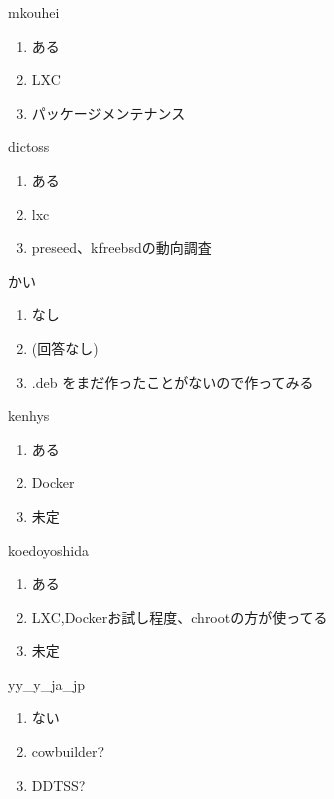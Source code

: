 \begin{prework}{ mkouhei }
  \begin{enumerate}
  \item ある
  \item LXC
  \item パッケージメンテナンス
  \end{enumerate}
\end{prework}

\begin{prework}{ dictoss }
  \begin{enumerate}
  \item ある
  \item lxc
  \item preseed、kfreebsdの動向調査
  \end{enumerate}
\end{prework}

\begin{prework}{ かい }
  \begin{enumerate}
  \item なし
  \item (回答なし)
  \item .deb をまだ作ったことがないので作ってみる
  \end{enumerate}
\end{prework}

\begin{prework}{ kenhys }
  \begin{enumerate}
  \item ある
  \item Docker
  \item 未定
  \end{enumerate}
\end{prework}

\begin{prework}{ koedoyoshida }
  \begin{enumerate}
  \item ある
  \item LXC,Dockerお試し程度、chrootの方が使ってる
  \item 未定
  \end{enumerate}
\end{prework}

\begin{prework}{ yy\_y\_ja\_jp }
  \begin{enumerate}
  \item ない
  \item cowbuilder?
  \item DDTSS?
  \end{enumerate}
\end{prework}
